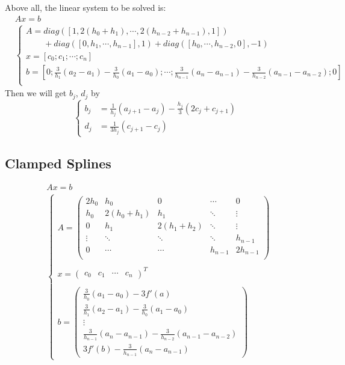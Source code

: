 Above all, the linear system to be solved is:
\begin{align*}
    &Ax=b \\
    &\begin{cases}
    A=diag([1,2(h_0+h_1),\cdots,2(h_{n-2}+h_{n-1}),1]) \\
    \phantom{A=}+diag([0,h_1,\cdots,h_{n-1}],1)+diag([h_0,\cdots,h_{n-2},0],-1) \\
    x = [c_0;c_1;\cdots;c_n] \\
    b = \left[0;\frac{3}{h_1}(a_2-a_1)-\frac{3}{h_0}(a_1-a_0);\cdots;\frac{3}{h_{n-1}}(a_n-a_{n-1})-\frac{3}{h_{n-2}}(a_{n-1}-a_{n-2});0\right] \\
    \end{cases}
\end{align*}
Then we will get $b_j$, $d_j$ by
\begin{equation*}
    \begin{cases}
    b_j &= \frac{1}{h_j}(a_{j+1}-a_j)-\frac{h_j}{3}(2c_j+c_{j+1}) \\
    d_j &= \frac{1}{3h_j}(c_{j+1}-c_j)
    \end{cases}
\end{equation*}

\subsection{Clamped Splines}
\begin{align*}
    &Ax=b \\
    &\begin{cases}
    A=\begin{pmatrix}
      2h_0 & h_0 & 0 & \cdots & 0 \\
      h_0 & 2(h_0+h_1) & h_1 & \ddots & \vdots \\
      0 & h_1 & 2(h_1+h_2) & \ddots & \vdots \\
      \vdots & \ddots & \ddots & \ddots & h_{n-1} \\
      0 & \cdots & \cdots & h_{n-1} & 2h_{n-1} \\
      \end{pmatrix} \\
    \\
    x = \begin{pmatrix}c_0 & c_1 & \cdots & c_n \end{pmatrix}^T \\
    \\
    b = \begin{pmatrix}
        \frac{3}{h_0}(a_1-a_0)-3f'(a) \\
        \frac{3}{h_1}(a_2-a_1)-\frac{3}{h_0}(a_1-a_0) \\
        \vdots \\
        \frac{3}{h_{n-1}}(a_n-a_{n-1})-\frac{3}{h_{n-2}}(a_{n-1}-a_{n-2}) \\
        3f'(b)-\frac{3}{h_{n-1}}(a_n-a_{n-1})
        \end{pmatrix}
    \end{cases}
\end{align*}
